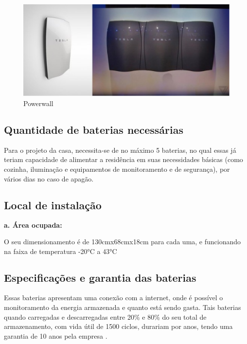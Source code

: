 \begin{figure}[H]
  \begin{center}
	\includegraphics[keepaspectratio,scale=1]{figuras/powerwall.eps}
	\caption{Powerwall}
  \end{center}
\end{figure}

\subsection{Quantidade de baterias necessárias}

	Para o projeto da casa, necessita-se de no máximo 5 baterias, no qual essas já teriam capacidade de alimentar a residência em suas necessidades básicas (como cozinha, iluminação e equipamentos de monitoramento e de segurança), por vários dias no caso de apagão.

\subsection{Local de instalação}

\textbf{a. Área ocupada:}

	O seu dimensionamento é de 130cmx68cmx18cm para cada uma, e funcionando na faixa de temperatura -20°C a 43°C \cite{TESLA}

\subsection{Especificações e garantia das baterias}

	Essas baterias apresentam uma conexão com a internet, onde é possível o monitoramento da energia armazenada e quanto está sendo gasta. Tais baterias quando carregadas e descarregadas entre 20\% e 80\% do seu total de armazenamento, com vida útil de 1500 ciclos, durariam por anos, tendo uma garantia de 10 anos pela empresa \cite{TESLA}.

